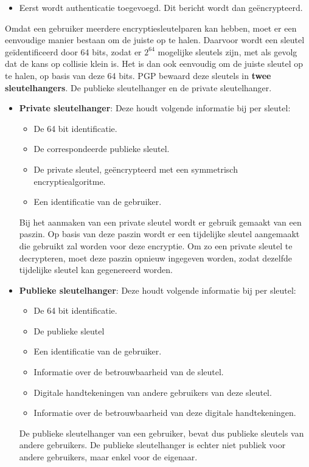 \documentclass{report}
\begin{document}
	\begin{itemize}
		\item[\info] Eerst wordt authenticatie toegevoegd. Dit bericht wordt dan geëncrypteerd. 
	\end{itemize}
	Omdat een gebruiker meerdere encryptiesleutelparen kan hebben, moet er een eenvoudige manier bestaan om de juiste op te halen. Daarvoor wordt een sleutel geïdentificeerd door 64 bits, zodat er $2^{64}$ mogelijke sleutels zijn, met als gevolg dat de kans op collisie klein is. Het is dan ook eenvoudig om de juiste sleutel op te halen, op basis van deze 64 bits. PGP bewaard deze sleutels in \textbf{twee sleutelhangers}. De publieke sleutelhanger en de private sleutelhanger.
	\begin{itemize}
		\item[\info] \textbf{Private sleutelhanger}: Deze houdt volgende informatie bij per sleutel:
		\begin{itemize}
			\item De 64 bit identificatie.
			\item De correspondeerde publieke sleutel.
			\item De private sleutel, geëncrypteerd met een symmetrisch encryptiealgoritme.
			\item Een identificatie van de gebruiker.
		\end{itemize}

		Bij het aanmaken van een private sleutel wordt er gebruik gemaakt van een paszin. Op basis van deze paszin wordt er een tijdelijke sleutel aangemaakt die gebruikt zal worden voor deze encryptie. Om zo een private sleutel te decrypteren, moet deze paszin opnieuw ingegeven worden, zodat dezelfde tijdelijke sleutel kan gegenereerd worden.

		\item[\info] \textbf{Publieke sleutelhanger}: Deze houdt volgende informatie bij per sleutel:
		\begin{itemize}F
			\item De 64 bit identificatie.
			\item De publieke sleutel
			\item Een identificatie van de gebruiker.
			\item Informatie over de betrouwbaarheid van de sleutel.
			\item Digitale handtekeningen van andere gebruikers van deze sleutel.
			\item Informatie over de betrouwbaarheid van deze digitale handtekeningen.
		\end{itemize}

		De publieke sleutelhanger van een gebruiker, bevat dus publieke sleutels van andere gebruikers. De publieke sleutelhanger is echter niet publiek voor andere gebruikers, maar enkel voor de eigenaar.
	\end{itemize}
\end{document}

